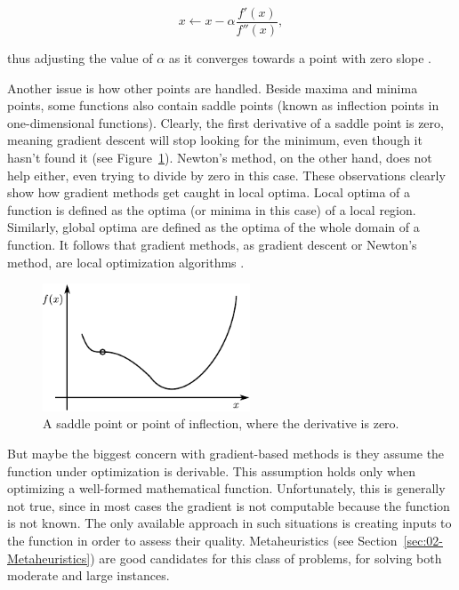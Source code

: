 \begin{equation}
x\leftarrow x-\alpha\frac{f'(x)}{f''(x)},
\end{equation}


\noindent thus adjusting the value of $\alpha$ as it converges towards
a point with zero slope \cite{Luke-Essentials_of_metaheuristics:2009}.

Another issue is how other points are handled. Beside maxima and minima
points, some functions also contain saddle points (known as inflection
points in one-dimensional functions). Clearly, the first derivative
of a saddle point is zero, meaning gradient descent will stop looking
for the minimum, even though it hasn't found it (see Figure~\ref{fig:02-gradient_descent_saddle_point}).
Newton's method, on the other hand, does not help either, even trying
to divide by zero in this case. These observations clearly show how
gradient methods get caught in local optima. Local optima of a function
is defined as the optima (or minima in this case) of a local region.
Similarly, global optima are defined as the optima of the whole domain
of a function. It follows that gradient methods, as gradient descent
or Newton\textquoteright{}s method, are local optimization algorithms
\cite{Luke-Essentials_of_metaheuristics:2009}.

\begin{figure}
\centering

\includegraphics[width=0.55\textwidth]{02-background_and_motivation/img/gradient_descent_saddle_point}

\caption{A saddle point or point of inflection, where the derivative is zero.
\label{fig:02-gradient_descent_saddle_point}}
\end{figure}


But maybe the biggest concern with gradient-based methods is they
assume the function under optimization is derivable. This assumption
holds only when optimizing a well-formed mathematical function. Unfortunately,
this is generally not true, since in most cases the gradient is not
computable because the function is not known. The only available approach
in such situations is creating inputs to the function in order to
assess their quality. Metaheuristics (see Section~\ref{sec:02-Metaheuristics})
are good candidates for this class of problems, for solving both moderate
and large instances.


